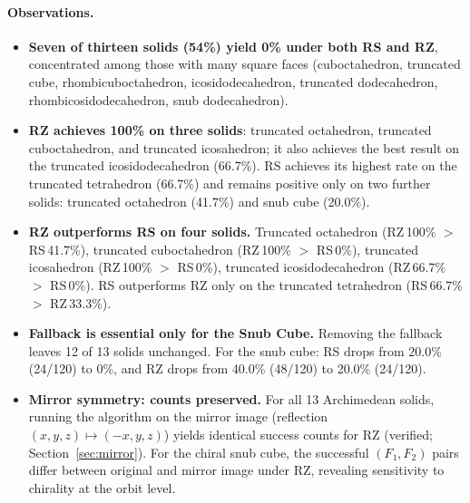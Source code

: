 \documentclass[12pt]{article}
\theoremstyle{definition}
\begin{document}
\paragraph{Observations.}
\begin{itemize}
  \item \textbf{Seven of thirteen solids (54\%) yield 0\% under both RS and RZ},
        concentrated among those with many square faces (cuboctahedron,
        truncated cube, rhombicuboctahedron, icosidodecahedron,
        truncated dodecahedron, rhombicosidodecahedron, snub dodecahedron).
  \item \textbf{RZ achieves 100\% on three solids}:
        truncated octahedron, truncated cuboctahedron, and
        truncated icosahedron; it also achieves the best
        result on the truncated icosidodecahedron (66.7\%).
        RS achieves its highest rate on the truncated tetrahedron (66.7\%)
        and remains positive only on two further solids:
        truncated octahedron (41.7\%) and snub cube (20.0\%).
  \item \textbf{RZ outperforms RS on four solids.}
        Truncated octahedron (RZ\,100\% $>$ RS\,41.7\%),
        truncated cuboctahedron (RZ\,100\% $>$ RS\,0\%),
        truncated icosahedron (RZ\,100\% $>$ RS\,0\%),
        truncated icosidodecahedron (RZ\,66.7\% $>$ RS\,0\%).
        RS outperforms RZ only on the truncated tetrahedron
        (RS\,66.7\% $>$ RZ\,33.3\%).
  \item \textbf{Fallback is essential only for the Snub Cube.}
        Removing the fallback leaves 12 of 13 solids unchanged.
        For the snub cube: RS drops from 20.0\% (24/120) to 0\%,
        and RZ drops from 40.0\% (48/120) to 20.0\% (24/120).
  \item \textbf{Mirror symmetry: counts preserved.}
        For all 13 Archimedean solids, running the algorithm on the mirror
        image (reflection $(x,y,z)\mapsto(-x,y,z)$) yields identical success
        counts for RZ (verified; Section~\ref{sec:mirror}).
        For the chiral snub cube, the successful $(F_1,F_2)$ pairs differ
        between original and mirror image under RZ, revealing sensitivity
        to chirality at the orbit level.
\end{itemize}
\end{document}
